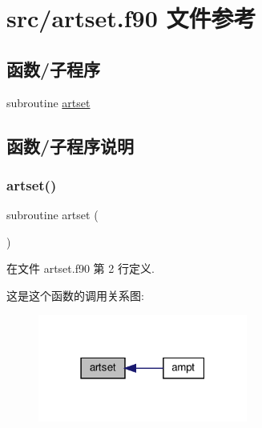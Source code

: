 \hypertarget{artset_8f90}{}\section{src/artset.f90 文件参考}
\label{artset_8f90}
\subsection*{函数/子程序}
\begin{DoxyCompactItemize}
\item 
subroutine \mbox{\hyperlink{artset_8f90_a055dd5dc2a41f897775caae5be293d69}{artset}}
\end{DoxyCompactItemize}


\subsection{函数/子程序说明}
\mbox{\label{artset_8f90_a055dd5dc2a41f897775caae5be293d69}} 
\subsubsection{\texorpdfstring{artset()}{artset()}}
{\footnotesize\ttfamily subroutine artset (\begin{DoxyParamCaption}{ }\end{DoxyParamCaption})}



在文件 artset.\+f90 第 2 行定义.

这是这个函数的调用关系图\+:
\nopagebreak
\begin{figure}[H]
\begin{center}
\leavevmode
\includegraphics[width=195pt]{artset_8f90_a055dd5dc2a41f897775caae5be293d69_icgraph}
\end{center}
\end{figure}
